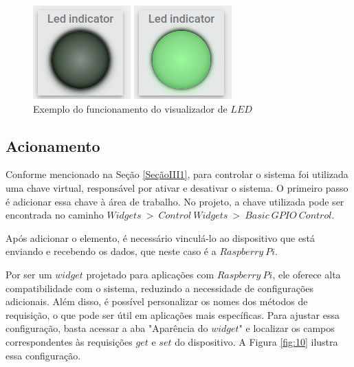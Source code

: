 \documentclass{ecatfg}
\begin{document}
\begin{figure}[!htb]
    \centering
    \begin{minipage}[!]{0.25\linewidth}
        \includegraphics[scale=0.50]{Figuras/led_apagado.png}
    \end{minipage}
    \begin{minipage}[!]{0.25\linewidth}
        \includegraphics[scale=0.50]{Figuras/led_ativo.png}
    \end{minipage}
    \caption{Exemplo do funcionamento do visualizador de $LED$}
    \label{fig:9}
\end{figure}

\subsection{Acionamento}

Conforme mencionado na Seção \ref{SeçãoIII1}, para controlar o sistema foi utilizada uma chave virtual, responsável por ativar e desativar o sistema. O primeiro passo é adicionar essa chave à área de trabalho. No projeto, a chave utilizada pode ser encontrada no caminho $Widgets\ >\ Control\ Widgets\ >\ Basic\ GPIO\ Control$. \par

Após adicionar o elemento, é necessário vinculá-lo ao dispositivo que está enviando e recebendo os dados, que neste caso é a $Raspberry\ Pi$. \par

Por ser um $widget$ projetado para aplicações com $Raspberry\ Pi$, ele oferece alta compatibilidade com o sistema, reduzindo a necessidade de configurações adicionais. Além disso, é possível personalizar os nomes dos métodos de requisição, o que pode ser útil em aplicações mais específicas. Para ajustar essa configuração, basta acessar a aba "Aparência do $widget$" e localizar os campos correspondentes às requisições $get$ e $set$ do dispositivo. A Figura \ref{fig:10} ilustra essa configuração. \par
\end{document}
